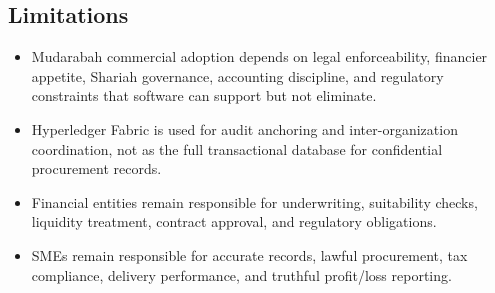 \documentclass[11pt,a4paper]{article}
\begin{document}
\subsection{Limitations}
\begin{itemize}
  \item Mudarabah commercial adoption depends on legal enforceability, financier appetite, Shariah governance, accounting discipline, and regulatory constraints that software can support but not eliminate.
  \item Hyperledger Fabric is used for audit anchoring and inter-organization coordination, not as the full transactional database for confidential procurement records.
  \item Financial entities remain responsible for underwriting, suitability checks, liquidity treatment, contract approval, and regulatory obligations.
  \item SMEs remain responsible for accurate records, lawful procurement, tax compliance, delivery performance, and truthful profit/loss reporting.
\end{itemize}
\end{document}
